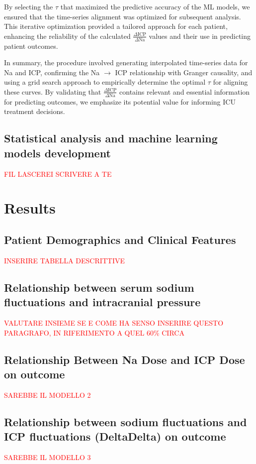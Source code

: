 By selecting the $\tau$ that maximized the predictive accuracy of the ML models, we ensured that the time-series alignment was optimized for subsequent analysis. This iterative optimization provided a tailored approach for each patient, enhancing the reliability of the calculated \(\frac{\Delta \text{ICP}}{\Delta \text{Na}}\) values and their use in predicting patient outcomes.

In summary, the procedure involved generating interpolated time-series data for Na and ICP, confirming the Na $\rightarrow$ ICP relationship with Granger causality, and using a grid search approach to empirically determine the optimal $\tau$ for aligning these curves. By validating that \(\frac{\Delta \text{ICP}}{\Delta \text{Na}}\) contains relevant and essential information for predicting outcomes, we emphasize its potential value for informing ICU treatment decisions.




\subsection{Statistical analysis and machine learning models development}
\textcolor{red}{FIL LASCEREI SCRIVERE A TE}

\section {Results}
\subsection{Patient Demographics and Clinical Features}
\textcolor{red}{INSERIRE TABELLA DESCRITTIVE}

\subsection{Relationship between serum sodium fluctuations and intracranial pressure}
\textcolor{red}{VALUTARE INSIEME SE E COME HA SENSO INSERIRE QUESTO PARAGRAFO, IN RIFERIMENTO A QUEL 60\% CIRCA}

\subsection{Relationship Between Na Dose and ICP Dose on outcome}
\textcolor{red}{SAREBBE IL MODELLO 2}

\subsection{Relationship between sodium fluctuations and ICP fluctuations (DeltaDelta) on outcome}
\textcolor{red}{SAREBBE IL MODELLO 3}

